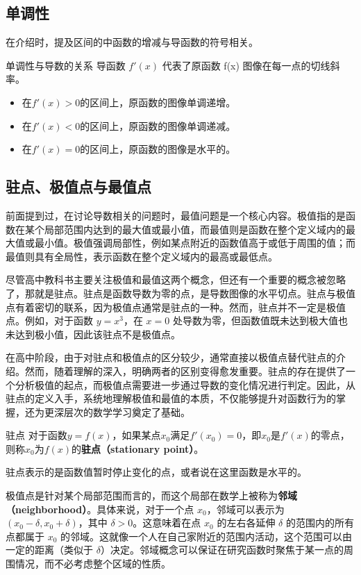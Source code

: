 \subsection{单调性}
在介绍时，提及区间的中函数的增减与导函数的符号相关。
\begin{theorem}{单调性与导数的关系}
导函数  $f'(x)$  代表了原函数  f(x)  图像在每一点的切线斜率。
\begin{itemize}
\item 在$f'(x)>0$的区间上，原函数的图像单调递增。
\item 在$f'(x)<0$的区间上，原函数的图像单调递减。
\item 在$f'(x)=0$的区间上，原函数的图像是水平的。
\end{itemize}
\end{theorem}


\subsection{驻点、极值点与最值点}

前面提到过，在讨论导数相关的问题时，最值问题是一个核心内容。极值指的是函数在某个局部范围内达到的最大值或最小值，而最值则是函数在整个定义域内的最大值或最小值。极值强调局部性，例如某点附近的函数值高于或低于周围的值；而最值则具有全局性，表示函数在整个定义域内的最高或最低点。

尽管高中教科书主要关注极值和最值这两个概念，但还有一个重要的概念被忽略了，那就是驻点。驻点是函数导数为零的点，是导数图像的水平切点。驻点与极值点有着密切的联系，因为极值点通常是驻点的一种。然而，驻点并不一定是极值点。例如，对于函数 $y = x^3$，在 $x = 0$ 处导数为零，但函数值既未达到极大值也未达到极小值，因此该驻点不是极值点。

在高中阶段，由于对驻点和极值点的区分较少，通常直接以极值点替代驻点的介绍。然而，随着理解的深入，明确两者的区别变得愈发重要。驻点的存在提供了一个分析极值的起点，而极值点需要进一步通过导数的变化情况进行判定。因此，从驻点的定义入手，系统地理解极值和最值的本质，不仅能够提升对函数行为的掌握，还为更深层次的数学学习奠定了基础。

\begin{definition}{驻点}
对于函数$y=f(x)$，如果某点$x_0$满足$f'(x_0)=0$，即$x_0$是$f'(x)$的零点，则称$x_0$为$f(x)$的\textbf{驻点（stationary point）}。
\end{definition}

驻点表示的是函数值暂时停止变化的点，或者说在这里函数是水平的。



极值点是针对某个局部范围而言的，而这个局部在数学上被称为\textbf{邻域（neighborhood）}。具体来说，对于一个点 $x_0$，邻域可以表示为 $\left( x_0 - \delta, x_0 + \delta \right)$，其中 $\delta > 0$。这意味着在点 $x_0$ 的左右各延伸 $\delta$ 的范围内的所有点都属于 $x_0$ 的邻域。这就像一个人在自己家附近的范围内活动，这个范围可以由一定的距离（类似于 $\delta$）决定。邻域概念可以保证在研究函数时聚焦于某一点的周围情况，而不必考虑整个区域的性质。


